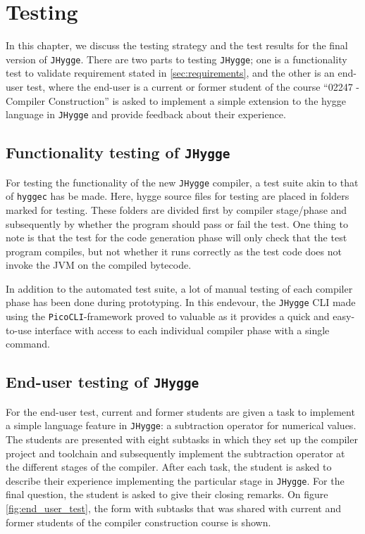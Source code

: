 \chapter{Testing}\label{sec:testing}

In this chapter, we discuss the testing strategy and the test results for the final version of \texttt{JHygge}.
There are two parts to testing \texttt{JHygge}; one is a functionality test to validate requirement stated in \ref{sec:requirements},
and the other is an end-user test, where the end-user is a current or former student of the course ``02247 - Compiler Construction''
is asked to implement a simple extension to the hygge language in \texttt{JHygge} and provide feedback about their experience.

\section{Functionality testing of \texttt{JHygge}}

For testing the functionality of the new \texttt{JHygge} compiler, a test suite akin to that of \texttt{hyggec} has be made.
Here, hygge source files for testing are placed in folders marked for testing. These folders are divided first by compiler
stage/phase and subsequently by whether the program should pass or fail the test. One thing to note is that the test
for the code generation phase will only check that the test program compiles, but not whether it runs correctly as the
test code does not invoke the JVM on the compiled bytecode.

In addition to the automated test suite, a lot of manual testing of each compiler phase has been done during prototyping.
In this endevour, the \texttt{JHygge} CLI made using the \texttt{PicoCLI}-framework proved to valuable as it provides a
quick and easy-to-use interface with access to each individual compiler phase with a single command.

\section{End-user testing of \texttt{JHygge}}

For the end-user test, current and former students are given a task to implement a simple language feature in \texttt{JHygge}:
a subtraction operator for numerical values. The students are presented with eight subtasks in which they set up the compiler
project and toolchain and subsequently implement the subtraction operator at the different stages of the compiler. After
each task, the student is asked to describe their experience implementing the particular stage in \texttt{JHygge}. For the
final question, the student is asked to give their closing remarks. On figure \ref{fig:end_user_test}, the form with subtasks
that was shared with current and former students of the compiler construction course is shown.

